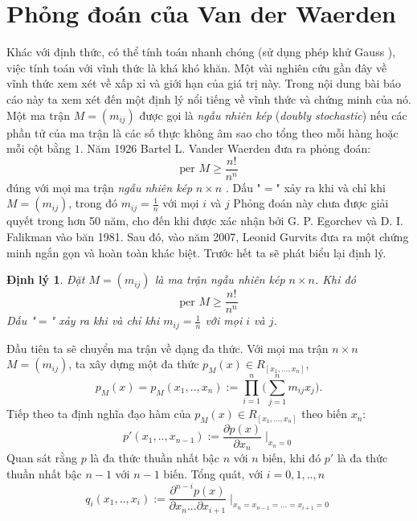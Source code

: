 \documentclass[a4paper, 12pt]{report}
\newtheorem{theoremnum}{Định lý } %
\begin{document}
\section{Phỏng đoán của Van der Waerden}
Khác với định thức, có thể tính toán nhanh chóng (sử dụng phép khử Gauss ), việc tính toán với vĩnh thức là khá khó khăn. Một vài nghiên cứu gần đây về vĩnh thức xem xét về xấp xỉ và giới hạn của giá trị này. Trong nội dung bài báo cáo này ta xem xét đến một định lý nổi tiếng về vĩnh thức và chứng minh của nó. Một ma trận $M=(m_{ij})$ được gọi là \textit{ngẫu nhiên kép} (\textit{doubly stochastic}) nếu các phần tử của ma trận là các số thực không âm sao cho tổng theo mỗi hàng hoặc mỗi cột bằng $1$. Năm 1926 Bartel L. Vander Waerden đưa ra phỏng đoán: 
\begin{equation*}
\textrm{per } M \geq \frac{n!}{n^n}
\end{equation*}
đúng với mọi ma trận \textit{ngẫu nhiên kép} $n \times n $ . Dấu "$=$"  xảy ra khi và chỉ khi $M=(m_{ij})$, trong đó $m_{ij} = \frac{1}{n}$ với mọi $i$ và $j$
Phỏng đoán này chưa được giải quyết trong hơn 50 năm, cho đến khi được xác nhận bởi G. P. Egorchev và D. I. Falikman vào băn 1981. Sau đó, vào năm 2007, Leonid Gurvits đưa ra một chứng minh ngắn gọn và hoàn toàn khác biệt. Trước hết ta sẽ phát biểu lại định lý.
\begin{theoremnum}
Đặt $M=(m_{ij})$ là ma trận \textit{ngẫu nhiên kép} $n \times n $. Khi đó
\begin{equation}
\textrm{per } M \geq \frac{n!}{n^n} \label{eqPer}
\end{equation}
Dấu "$=$" xảy ra khi và chỉ khi  $m_{ij} = \frac{1}{n}$ với mọi $i$ và $j$.
\end{theoremnum}
Đầu tiên ta sẽ chuyển ma trận về dạng đa thức. Với mọi ma trận $n  \times n$ $M = (m_{ij}) $, ta xây dựng một đa thức $p_M(x) \in R_{[x_1,...,x_n]} $, 
\begin{equation*}
	p_M(x) = p_M(x_1,..,x_n) := \displaystyle \prod_{i=1}^{n} \Big( \displaystyle \sum_{j=1}^{n} m_{ij}x_j \Big).
\end{equation*}
Tiếp theo ta định nghĩa đạo hàm của $p_M(x) \in R_{[x_1,...,x_n]} $  theo biến $x_n$:
\begin{equation*}
	 p'(x_1,..,x_{n-1}) := \frac{\partial p(x)}{\partial x_n}\mid _{x_n = 0}
\end{equation*}
Quan sát rằng $p$ là đa thức thuần nhất bậc $n$ với $n$ biến, khi đó $p'$ là đa thức thuần nhất bậc $n-1$ với $n-1$ biến. Tổng quát, với $i=0,1,..,n$
\begin{equation*}
	 q_i(x_1,..,x_{i}) := \frac{\partial^{n-i} p(x)}{\partial x_n...\partial x_{i+1}}\mid _{x_n = x_{n-1} = ... = x_{i+1} = 0}
\end{equation*}
\end{document}
